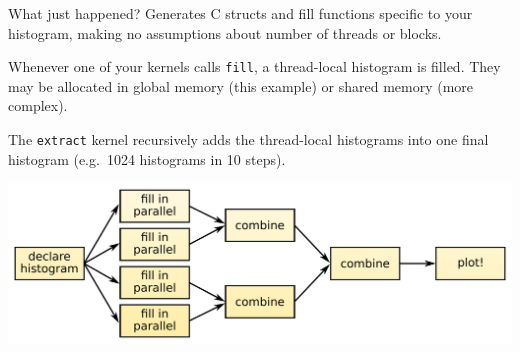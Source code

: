 \documentclass{beamer}
\begin{document}





\begin{frame}{What just happened?}
\vspace{0.5 cm}
Generates C structs and fill functions specific to your histogram, making no assumptions about number of threads or blocks.

\vspace{0.2 cm}
Whenever one of your kernels calls {\tt fill}, a thread-local histogram is filled. They may be allocated in global memory (this example) or shared memory (more complex).

\vspace{0.2 cm}
The {\tt extract} kernel recursively adds the thread-local histograms into one final histogram (e.g.\ 1024 histograms in 10 steps).

\vspace{0.3 cm}
\includegraphics[width=\linewidth]{parallelization.pdf}
\end{frame}
\end{document}
